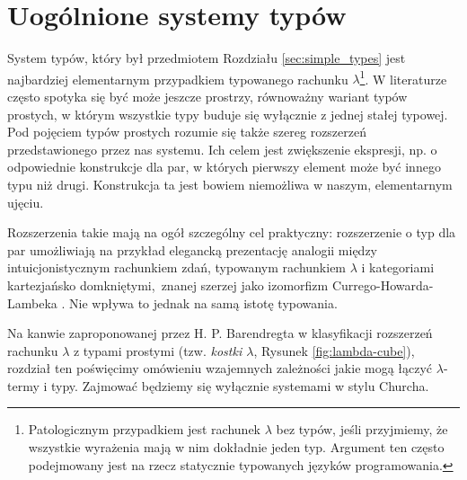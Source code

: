 \section{Uogólnione systemy typów}

System typów, który był przedmiotem Rozdziału \ref{sec:simple_types} jest najbardziej elementarnym przypadkiem typowanego rachunku \(\lambda\)\footnote{Patologicznym przypadkiem jest rachunek \(\lambda\) bez typów, jeśli przyjmiemy, że wszystkie wyrażenia mają w nim dokładnie jeden typ. Argument ten często podejmowany jest na rzecz statycznie typowanych języków programowania.}. W literaturze często spotyka się być może jeszcze prostrzy, równoważny wariant typów prostych, w którym wszystkie typy buduje się wyłącznie z jednej stałej typowej. Pod pojęciem typów prostych rozumie się także szereg rozszerzeń przedstawionego przez nas systemu. Ich celem jest zwiększenie ekspresji, np. o odpowiednie konstrukcje dla par, w których pierwszy element może być innego typu niż drugi. Konstrukcja ta jest bowiem niemożliwa w naszym, elementarnym ujęciu.

Rozszerzenia takie mają na ogół szczególny cel praktyczny: rozszerzenie o typ dla par umożliwiają na przykład elegancką prezentację analogii między intuicjonistycznym rachunkiem zdań, typowanym rachunkiem \(\lambda\) i kategoriami kartezjańsko domkniętymi, znanej szerzej jako izomorfizm Currego-Howarda-Lambeka \cite[Rozdział 3.1]{Girard:1989:PT:64805}. Nie wpływa to jednak na samą istotę typowania.  

Na kanwie zaproponowanej przez H. P. Barendregta w \cite[Rozdział 5]{Barendregt_1992} klasyfikacji rozszerzeń rachunku \(\lambda\) z typami prostymi (tzw. \emph{kostki \(\lambda\)}, Rysunek \ref{fig:lambda-cube}), rozdział ten poświęcimy omówieniu wzajemnych zależności jakie mogą łączyć \(\lambda\)-termy i typy. Zajmować będziemy się wyłącznie systemami w stylu Churcha.

